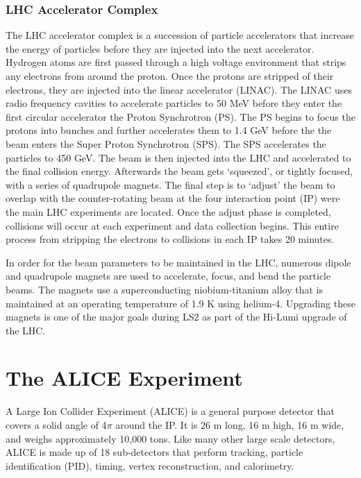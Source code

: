 \subsubsection{LHC Accelerator Complex}\label{sec:LHCop}
The LHC accelerator complex is a succession of particle accelerators that increase the energy of particles before they are injected into the next accelerator.  Hydrogen atoms are first passed through a high voltage environment that strips any electrons from around the proton.  Once the protons are stripped of their electrons, they are injected into the linear accelerator (LINAC).  The LINAC uses radio frequency cavities to accelerate particles to 50 MeV before they enter the first circular accelerator the Proton Synchrotron (PS).  The PS begins to focus the protons into bunches and further accelerates them to 1.4 GeV before the the beam enters the Super Proton Synchrotron (SPS).  The SPS accelerates the particles to 450 GeV.  The beam is then injected into the LHC and accelerated to the final collision energy.  Afterwards the beam gets `squeezed', or tightly focused, with a series of quadrupole magnets.  The final step is to `adjust'  the beam to overlap with the counter-rotating beam at the four interaction point (IP) were the main LHC experiments are located.  Once the adjust phase is completed, collisions will occur at each experiment and data  collection begins.  This entire process from stripping the electrons to collisions in each IP takes 20 minutes.

In order for the beam parameters to be maintained in the LHC, numerous dipole and quadrupole magnets are used to accelerate, focus, and bend the particle beams.  The magnets use a superconducting niobium-titanium alloy that is maintained at an operating temperature of 1.9 K using helium-4.  Upgrading these magnets is one of the major goals during LS2 as part of the Hi-Lumi upgrade of the LHC\cite{Fabjan:2011jb}.


\section{The ALICE Experiment}
A Large Ion Collider Experiment (ALICE) is a general purpose detector that covers a solid angle of 4$ \pi$ around the IP.  It is 26 m long, 16 m high, 16 m wide, and weighs approximately 10,000 tons\cite{Fabjan:2011jb}.  Like many other large scale detectors, ALICE is made up of 18 sub-detectors that perform tracking, particle identification (PID), timing, vertex reconstruction, and calorimetry.  



